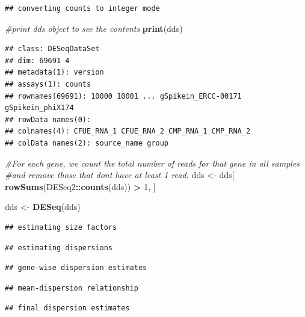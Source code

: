 \documentclass[
]{article}
\newenvironment{Shaded}{\begin{snugshade}}{\end{snugshade}}
\newcommand{\CommentTok}[1]{\textcolor[rgb]{0.56,0.35,0.01}{\textit{#1}}}
\newcommand{\DecValTok}[1]{\textcolor[rgb]{0.00,0.00,0.81}{#1}}
\newcommand{\FunctionTok}[1]{\textcolor[rgb]{0.13,0.29,0.53}{\textbf{#1}}}
\newcommand{\NormalTok}[1]{#1}
\newcommand{\OtherTok}[1]{\textcolor[rgb]{0.56,0.35,0.01}{#1}}
\newcommand{\SpecialCharTok}[1]{\textcolor[rgb]{0.81,0.36,0.00}{\textbf{#1}}}
\begin{document}
\begin{verbatim}
## converting counts to integer mode
\end{verbatim}

\begin{Shaded}
\begin{Highlighting}[]
\CommentTok{\#print dds object to see the contents}
\FunctionTok{print}\NormalTok{(dds)}
\end{Highlighting}
\end{Shaded}

\begin{verbatim}
## class: DESeqDataSet 
## dim: 69691 4 
## metadata(1): version
## assays(1): counts
## rownames(69691): 10000 10001 ... gSpikein_ERCC-00171 gSpikein_phiX174
## rowData names(0):
## colnames(4): CFUE_RNA_1 CFUE_RNA_2 CMP_RNA_1 CMP_RNA_2
## colData names(2): source_name group
\end{verbatim}

\begin{Shaded}
\begin{Highlighting}[]
\CommentTok{\#For each gene, we count the total number of reads for that gene in all samples }
\CommentTok{\#and remove those that don\textquotesingle{}t have at least 1 read. }
\NormalTok{dds }\OtherTok{\textless{}{-}}\NormalTok{ dds[ }\FunctionTok{rowSums}\NormalTok{(DESeq2}\SpecialCharTok{::}\FunctionTok{counts}\NormalTok{(dds)) }\SpecialCharTok{\textgreater{}} \DecValTok{1}\NormalTok{, ]}

\NormalTok{dds }\OtherTok{\textless{}{-}} \FunctionTok{DESeq}\NormalTok{(dds)}
\end{Highlighting}
\end{Shaded}

\begin{verbatim}
## estimating size factors
\end{verbatim}

\begin{verbatim}
## estimating dispersions
\end{verbatim}

\begin{verbatim}
## gene-wise dispersion estimates
\end{verbatim}

\begin{verbatim}
## mean-dispersion relationship
\end{verbatim}

\begin{verbatim}
## final dispersion estimates
\end{verbatim}
\end{document}
